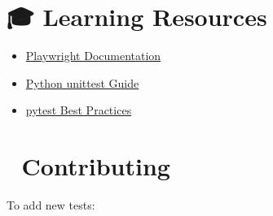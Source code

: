 \documentclass[
  11pt,
  oneside,
  openany]{scrbook}
\providecommand{\tightlist}{%
  \setlength{\itemsep}{0pt}\setlength{\parskip}{0pt}}\usepackage{longtable,booktabs,array}
\begin{document}
\section{🎓 Learning Resources}\label{learning-resources}

\begin{itemize}
\tightlist
\item
  \href{https://playwright.dev/python/}{Playwright Documentation}
\item
  \href{https://docs.python.org/3/library/unittest.html}{Python unittest
  Guide}
\item
  \href{https://docs.pytest.org/}{pytest Best Practices}
\end{itemize}

\section{🤝 Contributing}\label{contributing}

To add new tests:
\end{document}
